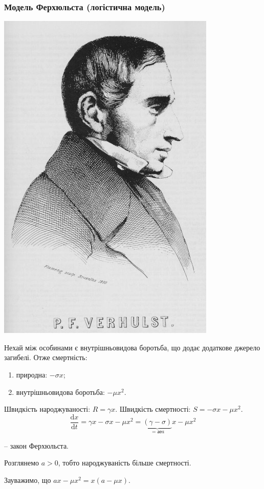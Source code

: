 \documentclass[14pt,a4paper]{scrartcl}
\theoremstyle{definition}
\theoremstyle{definition}
\theoremstyle{definition}
\begin{document}
\subsubsection{Модель Ферхюльста (логістична модель)}
\begin{center}
  \includegraphics[scale=0.6]{assets/verhulst.jpg}
\end{center}

Нехай між особинами є внутрішньовидова боротьба, що додає додаткове джерело загибелі. Отже смертність:
\begin{enumerate}
  \item природна:  $-\sigma x$;
  \item внутрішньовидова боротьба: $- \mu x^2$.
\end{enumerate}

Швидкість народжуваності: $R = \gamma x$.  Швидкість смертності: $S = - \sigma x - \mu x^2$.\\
$$
\dfrac{\mathrm{d}x}{\mathrm{d}t}  = \gamma x -  \sigma x - \mu x^2 = \underbrace{(\gamma - \sigma)}_{=аеa}x - \mu x^2
$$

\begin{center}
     -- закон Ферхюльста.
\end{center}
Розглянемо $a > 0$, тобто народжуваність більше смертності.
\begin{center}
  Зауважимо, що $ax - \mu x^2 = x ( a - \mu x)$.
\end{center}
\end{document}
